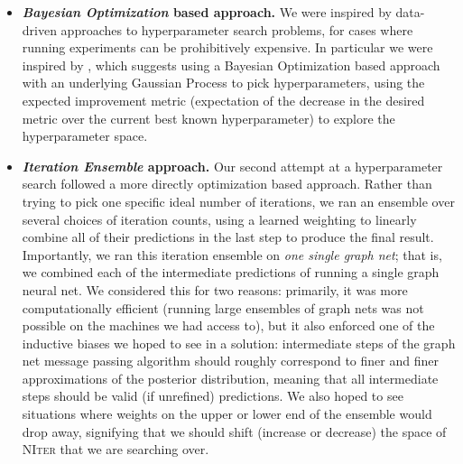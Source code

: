 \begin{itemize}
\item \textbf{\emph{Bayesian Optimization} based approach.}
  We were inspired by data-driven approaches to hyperparameter search problems, for cases where running experiments can be prohibitively expensive.
  In particular we were inspired by \cite{snoek2012practical}, which suggests using a Bayesian Optimization based approach with an underlying Gaussian Process to pick hyperparameters, using the expected improvement metric (expectation of the decrease in the desired metric over the current best known hyperparameter) to explore the hyperparameter space.
\item \textbf{\emph{Iteration Ensemble} approach.}
  Our second attempt at a hyperparameter search followed a more directly optimization based approach.
  Rather than trying to pick one specific ideal number of iterations, we ran an ensemble over several choices of iteration counts, using a learned weighting to linearly combine all of their predictions in the last step to produce the final result.
  Importantly, we ran this iteration ensemble on \emph{one single graph net}; that is, we combined each of the intermediate predictions of running a single graph neural net.
  We considered this for two reasons: primarily, it was more computationally efficient (running large ensembles of graph nets was not possible on the machines we had access to), but it also enforced one of the inductive biases we hoped to see in a solution: intermediate steps of the graph net message passing algorithm should roughly correspond to finer and finer approximations of the posterior distribution, meaning that all intermediate steps should be valid (if unrefined) predictions.
  We also hoped to see situations where weights on the upper or lower end of the ensemble would drop away, signifying that we should shift (increase or decrease) the space of \textsc{NIter} that we are searching over.
\end{itemize}